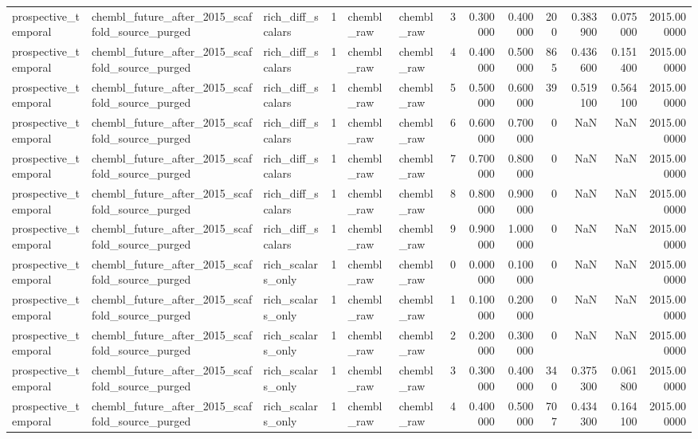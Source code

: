 \begin{longtable}{lllrllrrrrrrr}
prospective\_temporal & chembl\_future\_after\_2015\_scaffold\_source\_purged & rich\_diff\_scalars & 1 & chembl\_raw & chembl\_raw & 3 & 0.300000 & 0.400000 & 200 & 0.383900 & 0.075000 & 2015.000000 \\
prospective\_temporal & chembl\_future\_after\_2015\_scaffold\_source\_purged & rich\_diff\_scalars & 1 & chembl\_raw & chembl\_raw & 4 & 0.400000 & 0.500000 & 865 & 0.436600 & 0.151400 & 2015.000000 \\
prospective\_temporal & chembl\_future\_after\_2015\_scaffold\_source\_purged & rich\_diff\_scalars & 1 & chembl\_raw & chembl\_raw & 5 & 0.500000 & 0.600000 & 39 & 0.519100 & 0.564100 & 2015.000000 \\
prospective\_temporal & chembl\_future\_after\_2015\_scaffold\_source\_purged & rich\_diff\_scalars & 1 & chembl\_raw & chembl\_raw & 6 & 0.600000 & 0.700000 & 0 & NaN & NaN & 2015.000000 \\
prospective\_temporal & chembl\_future\_after\_2015\_scaffold\_source\_purged & rich\_diff\_scalars & 1 & chembl\_raw & chembl\_raw & 7 & 0.700000 & 0.800000 & 0 & NaN & NaN & 2015.000000 \\
prospective\_temporal & chembl\_future\_after\_2015\_scaffold\_source\_purged & rich\_diff\_scalars & 1 & chembl\_raw & chembl\_raw & 8 & 0.800000 & 0.900000 & 0 & NaN & NaN & 2015.000000 \\
prospective\_temporal & chembl\_future\_after\_2015\_scaffold\_source\_purged & rich\_diff\_scalars & 1 & chembl\_raw & chembl\_raw & 9 & 0.900000 & 1.000000 & 0 & NaN & NaN & 2015.000000 \\
prospective\_temporal & chembl\_future\_after\_2015\_scaffold\_source\_purged & rich\_scalars\_only & 1 & chembl\_raw & chembl\_raw & 0 & 0.000000 & 0.100000 & 0 & NaN & NaN & 2015.000000 \\
prospective\_temporal & chembl\_future\_after\_2015\_scaffold\_source\_purged & rich\_scalars\_only & 1 & chembl\_raw & chembl\_raw & 1 & 0.100000 & 0.200000 & 0 & NaN & NaN & 2015.000000 \\
prospective\_temporal & chembl\_future\_after\_2015\_scaffold\_source\_purged & rich\_scalars\_only & 1 & chembl\_raw & chembl\_raw & 2 & 0.200000 & 0.300000 & 0 & NaN & NaN & 2015.000000 \\
prospective\_temporal & chembl\_future\_after\_2015\_scaffold\_source\_purged & rich\_scalars\_only & 1 & chembl\_raw & chembl\_raw & 3 & 0.300000 & 0.400000 & 340 & 0.375300 & 0.061800 & 2015.000000 \\
prospective\_temporal & chembl\_future\_after\_2015\_scaffold\_source\_purged & rich\_scalars\_only & 1 & chembl\_raw & chembl\_raw & 4 & 0.400000 & 0.500000 & 707 & 0.434300 & 0.164100 & 2015.000000 \\

\end{longtable}
